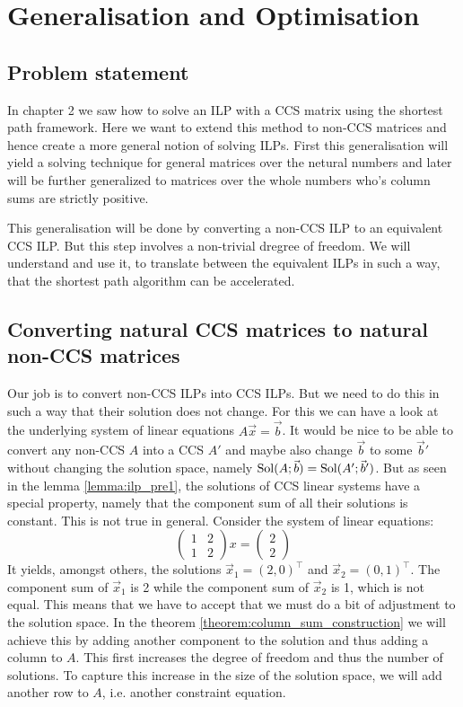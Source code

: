 \chapter{Generalisation and Optimisation}
\section{Problem statement}
In chapter 2 we saw how to solve an ILP with a CCS matrix using the shortest path framework. Here we want to extend this method to non-CCS matrices and hence create a more general notion of solving ILPs. First this generalisation will yield a solving technique for general matrices over the netural numbers and later will be further generalized to matrices over the whole numbers who's column sums are strictly positive. 

This generalisation will be done by converting a non-CCS ILP to an equivalent CCS ILP. But this step involves a non-trivial dregree of freedom. We will understand and use it, to translate between the equivalent ILPs in such a way, that the shortest path algorithm can be accelerated. 

\section{Converting natural CCS matrices to natural non-CCS matrices}
Our job is to convert non-CCS ILPs into CCS ILPs. But we need to do this in such a way that their solution does not change. For this we can have a look at the underlying system of linear equations $A\vec x = \vec b$. It would be nice to be able to convert any non-CCS $A$ into a CCS $A'$ and maybe also change $\vec b$ to some $\vec b'$ without changing the solution space, namely $\operatorname{Sol}(A;\vec b) = \operatorname{Sol}(A';\vec b')$. But as seen in the lemma \ref{lemma:ilp_pre1}, the solutions of CCS linear systems have a special property, namely that the component sum of all their solutions is constant. This is not true in general. Consider the system of linear equations:
$$
\left(\begin{matrix}
    1 & 2\\
    1 & 2
\end{matrix}\right)
x = \left(\begin{matrix}
    2\\2
\end{matrix}\right)
$$
It yields, amongst others, the solutions $\vec x_1 = (2, 0)^\top$ and $\vec x_2 = (0, 1)^\top$. The component sum of $\vec x_1$ is 2 while the component sum of $\vec x_2$ is 1, which is not equal. This means that we have to accept that we must do a bit of adjustment to the solution space. In the theorem \ref{theorem:column_sum_construction} we will achieve this by adding another component to the solution and thus adding a column to $A$. This first increases the degree of freedom and thus the number of solutions. To capture this increase in the size of the solution space, we will add another row to $A$, i.e. another constraint equation.

